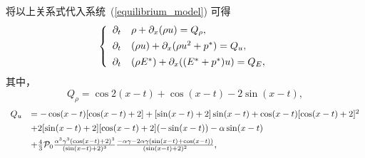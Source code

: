 将以上关系式代入系统~(\ref{equilibrium_model}) 可得
\begin{equation}\label{equilibrium_model_MMS}
\left\{
\begin{array}{lll}
 \partial_t&\rho+\partial_x(\rho {u})=Q_\rho,\vspace{1ex}\\
 \partial_t&(\rho {u})+\partial_x(\rho {u}^2+p^*)=Q_u,\vspace{1ex}\\
 \partial_t&(\rho E^*)+\partial_x(( E^*+p^*){u})=Q_E,
\end{array}
\right.
\end{equation}
其中，
\begin{equation}\label{equilibrium_model_Q_rho}
Q_\rho=\cos2(x-t)+\cos(x-t)-2\sin(x-t),
\end{equation}
\begin{equation}\label{equilibrium_model_Q_u}
\begin{array}{rl}
Q_u&=-\cos(x-t)[\cos(x-t)+2]+[\sin(x-t)+2]\sin(x-t)+\cos(x-t)[\cos(x-t)+2]^2\vspace{1ex}\\
&+2[\sin(x-t)+2][\cos(x-t)+2](-\sin(x-t))-\alpha \sin(x-t)\vspace{1ex}\\
&+\frac{4}{3}\mathcal{P}_0\frac{\alpha^3\gamma^3(\cos(x-t)+2)^3}{(\sin(x-t)+2)^3}\frac{-\alpha\gamma-2\alpha\gamma(\sin(x-t)+\cos(x-t))}{(\sin(x-t)+2)^2},
\end{array}
\end{equation}
